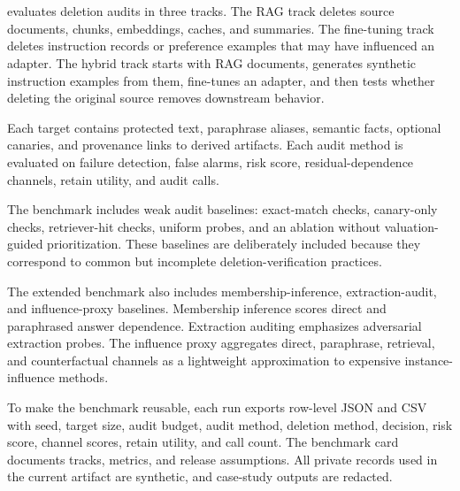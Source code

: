 \section{\bench{}}

\bench{} evaluates deletion audits in three tracks. The RAG track deletes source documents, chunks, embeddings, caches, and summaries. The fine-tuning track deletes instruction records or preference examples that may have influenced an adapter. The hybrid track starts with RAG documents, generates synthetic instruction examples from them, fine-tunes an adapter, and then tests whether deleting the original source removes downstream behavior.

Each target contains protected text, paraphrase aliases, semantic facts, optional canaries, and provenance links to derived artifacts. Each audit method is evaluated on failure detection, false alarms, risk score, residual-dependence channels, retain utility, and audit calls.

The benchmark includes weak audit baselines: exact-match checks, canary-only checks, retriever-hit checks, uniform probes, and an \method{} ablation without valuation-guided prioritization. These baselines are deliberately included because they correspond to common but incomplete deletion-verification practices.

The extended benchmark also includes membership-inference, extraction-audit, and influence-proxy baselines. Membership inference scores direct and paraphrased answer dependence. Extraction auditing emphasizes adversarial extraction probes. The influence proxy aggregates direct, paraphrase, retrieval, and counterfactual channels as a lightweight approximation to expensive instance-influence methods.

To make the benchmark reusable, each run exports row-level JSON and CSV with seed, target size, audit budget, audit method, deletion method, decision, risk score, channel scores, retain utility, and call count. The benchmark card documents tracks, metrics, and release assumptions. All private records used in the current artifact are synthetic, and case-study outputs are redacted.
